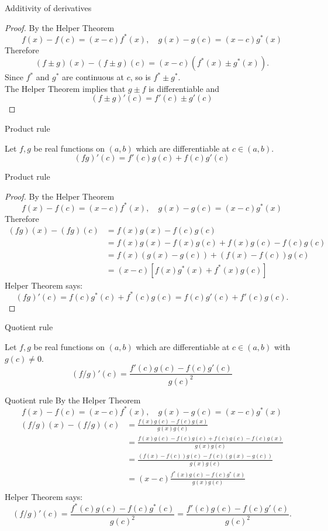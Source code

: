 \documentclass{beamer}
\begin{document}
\begin{frame}{Additivity of derivatives}
\begin{proof}
\pause
By the Helper Theorem
$$f(x)-f(c) = (x-c)f^*(x),\quad g(x)-g(c) = (x-c)g^*(x)$$
\pause
Therefore
$$(f\pm g)(x) - (f\pm g)(c) = (x-c)(f^*(x) \pm g^*(x)).$$
\pause
Since $f^*$ and $g^*$ are continuous at $c$, so is $f^*\pm g^*$.\\
\pause
The Helper Theorem implies that $g\pm f$ is differentiable and
$$(f\pm g)'(c) = f'(c) \pm g'(c)$$
\end{proof}
\end{frame}

\begin{frame}{Product rule}
\begin{thm}
Let $f,g$ be real functions on $(a,b)$ which are differentiable at $c\in (a,b)$.\\
$$(fg)'(c) = f'(c)g(c) + f(c)g'(c)$$
\end{thm}
\end{frame}
\begin{frame}{Product rule}
\begin{proof}
\pause
By the Helper Theorem
$$f(x)-f(c) = (x-c)f^*(x),\quad g(x)-g(c) = (x-c)g^*(x)$$
\pause
Therefore
\begin{align*}
(fg)(x)-(fg)(c)
  & = f(x)g(x) - f(c)g(c)\\
  & = f(x)g(x) - f(x)g(c) + f(x)g(c)-f(c)g(c)\\
  & = f(x)(g(x) - g(c)) + (f(x)-f(c))g(c)\\
  & = (x-c)[f(x)g^*(x) + f^*(x)g(c)]
\end{align*}
\pause
Helper Theorem says:
$$(fg)'(c) = f(c)g^*(c) + f^*(c)g(c) = f(c)g'(c) + f'(c)g(c).$$
\end{proof}
\end{frame}

\begin{frame}{Quotient rule}
\begin{thm}
Let $f,g$ be real functions on $(a,b)$ which are differentiable at $c\in (a,b)$ with $g(c)\neq 0$.\\
$$(f/g)'(c) = \frac{f'(c)g(c) - f(c)g'(c)}{g(c)^2}$$
\end{thm}
\end{frame}
\begin{frame}{Quotient rule}\mbox{}
{\tiny
By the Helper Theorem
$$f(x)-f(c) = (x-c)f^*(x),\quad g(x)-g(c) = (x-c)g^*(x)$$
\pause
\begin{align*}
(f/g)(x) - (f/g)(c)
  & = \frac{f(x)g(c)-f(c)g(x)}{g(x)g(c)}\\
  & = \frac{f(x)g(c)-f(c)g(c)+f(c)g(c)-f(c)g(x)}{g(x)g(c)}\\
  & = \frac{(f(x)-f(c))g(c)-f(c)(g(x)-g(c))}{g(x)g(c)}\\
  & = (x-c)\frac{f^*(x)g(c)-f(c)g^*(x)}{g(x)g(c)}\\
\end{align*}
\pause
Helper Theorem says:
$$(f/g)'(c) = \frac{f^*(c)g(c)-f(c)g^*(c)}{g(c)^2} = \frac{f'(c)g(c)-f(c)g'(c)}{g(c)^2}.$$
}
\end{frame}
\end{document}
